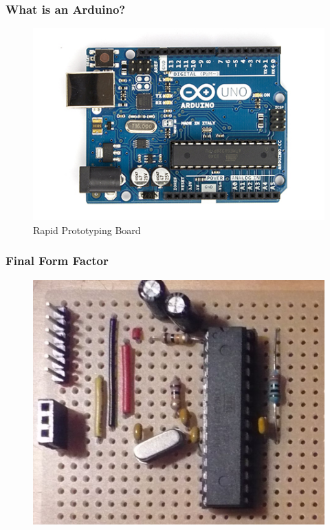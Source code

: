 \begin{frame}
	\frametitle{What is an Arduino?}
	\begin{figure}
		\includegraphics[scale=1.2]{assets/arduino}  
		\caption{Rapid Prototyping Board}
	\end{figure}
\end{frame}

\begin{frame}
	\frametitle{Final Form Factor}
	
	 \begin{figure}
		\includegraphics[scale=.3]{assets/diy} 
	\end{figure}
\end{frame}


